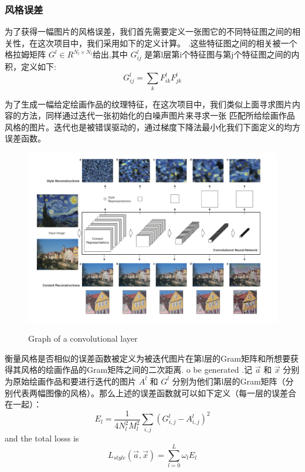 \documentclass[10pt,a4paper]{ctexart}
\begin{document}
    \subsubsection{风格误差}
    为了获得一幅图片的风格误差，我们首先需要定义一张图它的不同特征图之间的相关性，在这次项目中，我们采用如下的定义计算。
    .这些特征图之间的相关被一个格拉姆矩阵
	 $G^l \in R^{N_l\times N_l}$给出,其中 $G_{ij}^l$ 是第l层第i个特征图与第j个特征图之间的内积，定义如下:
	\begin{equation}
	G_{ij}^{l} = \sum_k F_{ik}^lF_{jk}^l	
	\end{equation}

    为了生成一幅给定绘画作品的纹理特征，在这次项目中，我们类似上面寻求图片内容的方法，同样通过迭代一张初始化的白噪声图片来寻求一张
    匹配所给绘画作品风格的图片。迭代也是被错误驱动的，通过梯度下降法最小化我们下面定义的均方误差函数。
    
	\begin{figure}[h]
		\centering
		{\includegraphics[width=0.8\linewidth]{pie.png}}
		\caption{Graph of a convolutional layer}
	\end{figure}
    衡量风格是否相似的误差函数被定义为被迭代图片在第l层的Gram矩阵和所想要获得其风格的绘画作品的Gram矩阵之间的二次距离.
	o be generated .记 $\overrightarrow{a}$ 和 $\overrightarrow{x}$ 分别为原始绘画作品和要进行迭代的图片
	 $A^l$ 和 $G^l$ 分别为他们第l层的Gram矩阵（分别代表两幅图像的风格）。那么上述的误差函数就可以如下定义（每一层的误差合在一起）：
	\begin{equation}
	E_l = \dfrac{1}{4N_l^2M_l^2}\sum_{i,j}(G_{i,j}^l - A_{i,j}^l)^2
	\end{equation}
	and the total losss is 
	\begin{equation}
	L_{style}(\overrightarrow{a},\overrightarrow{x})= \sum_{l=0}^{L}\omega_l
	E_l
	\end{equation}
	
\end{document}
